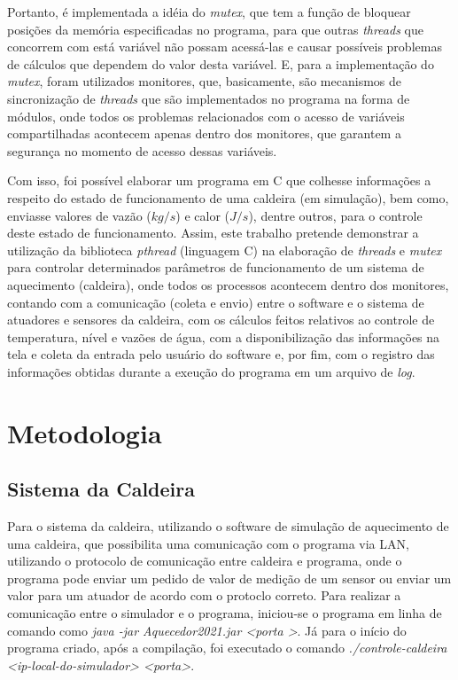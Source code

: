 \documentclass[journal]{IEEEtran}
\begin{document}
Portanto, é implementada a idéia do \textit{mutex}, que tem a função de bloquear posições da
memória especificadas no programa, para que outras \textit{threads} que concorrem com está
variável não possam acessá-las e causar possíveis problemas de cálculos que dependem do valor
desta variável. E, para a implementação do \textit{mutex}, foram utilizados monitores, que,
basicamente, são mecanismos de sincronização de \textit{threads} que são implementados no
programa na forma de módulos, onde todos os problemas relacionados com o acesso de variáveis
compartilhadas acontecem apenas dentro dos monitores, que garantem a segurança no momento
de acesso dessas variáveis.

Com isso, foi possível elaborar um programa em C que colhesse informações a respeito do
estado de funcionamento de uma caldeira (em simulação), bem como, enviasse valores de vazão ($kg/s$) e calor
($J/s$), dentre outros, para o controle deste estado de funcionamento. Assim, este trabalho
pretende demonstrar a utilização da biblioteca \textit{pthread} (linguagem C) na elaboração
de \textit{threads} e \textit{mutex} para controlar determinados parâmetros de funcionamento
de um sistema de aquecimento (caldeira), onde todos os processos acontecem dentro dos monitores,
contando com a comunicação (coleta e envio) entre o software e o sistema de atuadores e sensores da caldeira,
com os cálculos feitos relativos ao controle de temperatura, nível e vazões de água, com a disponibilização
das informações na tela e coleta da entrada pelo usuário do software e, por fim, com o registro das informações obtidas durante a exeução do programa em um
arquivo de \textit{log}.

\section{Metodologia}

\subsection{Sistema da Caldeira}
Para o sistema da caldeira, utilizando o software de simulação de aquecimento de uma caldeira, que possibilita
uma comunicação com o programa via LAN, utilizando o protocolo de comunicação entre caldeira e programa, onde
o programa pode enviar um pedido de valor de medição de um sensor ou enviar um valor para um atuador de
acordo com o protoclo correto. Para realizar a comunicação entre o simulador e o programa, iniciou-se o programa
em linha de comando como \textit{java -jar Aquecedor2021.jar \textless porta \textgreater}. Já para o início do programa criado,
após a compilação, foi executado o comando \textit{./controle-caldeira \textless ip-local-do-simulador\textgreater \vspace{1pt} \textless porta\textgreater}.
\end{document}

